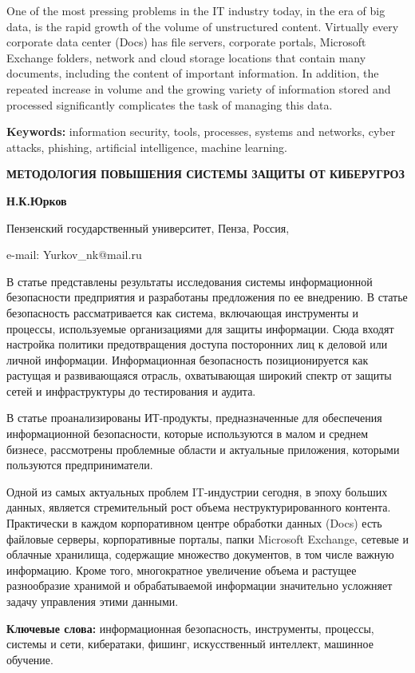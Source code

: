 One of the most pressing problems in the IT industry today, in the era
of big data, is the rapid growth of the volume of unstructured content.
Virtually every corporate data center (Docs) has file servers, corporate
portals, Microsoft Exchange folders, network and cloud storage locations
that contain many documents, including the content of important
information. In addition, the repeated increase in volume and the
growing variety of information stored and processed significantly
complicates the task of managing this data.

\textbf{Keywords:} information security, tools, processes, systems and
networks, cyber attacks, phishing, artificial intelligence, machine
learning.

\textbf{МЕТОДОЛОГИЯ ПОВЫШЕНИЯ СИСТЕМЫ ЗАЩИТЫ ОТ КИБЕРУГРОЗ}

\textbf{Н.К.Юрков}

Пензенский государственный университет, Пенза, Россия,

e-mail: Yurkov\_nk@mail.ru

В статье представлены результаты исследования системы информационной
безопасности предприятия и разработаны предложения по ее внедрению. В
статье безопасность рассматривается как система, включающая инструменты
и процессы, используемые организациями для защиты информации. Сюда
входят настройка политики предотвращения доступа посторонних лиц к
деловой или личной информации. Информационная безопасность
позиционируется как растущая и развивающаяся отрасль, охватывающая
широкий спектр от защиты сетей и инфраструктуры до тестирования и
аудита.

В статье проанализированы ИТ-продукты, предназначенные для обеспечения
информационной безопасности, которые используются в малом и среднем
бизнесе, рассмотрены проблемные области и актуальные приложения,
которыми пользуются предприниматели.

Одной из самых актуальных проблем IT-индустрии сегодня, в эпоху больших
данных, является стремительный рост объема неструктурированного
контента. Практически в каждом корпоративном центре обработки данных
(Docs) есть файловые серверы, корпоративные порталы, папки Microsoft
Exchange, сетевые и облачные хранилища, содержащие множество документов,
в том числе важную информацию. Кроме того, многократное увеличение
объема и растущее разнообразие хранимой и обрабатываемой информации
значительно усложняет задачу управления этими данными.

\textbf{Ключевые слова:} информационная безопасность, инструменты,
процессы, системы и сети, кибератаки, фишинг, искусственный интеллект,
машинное обучение.

